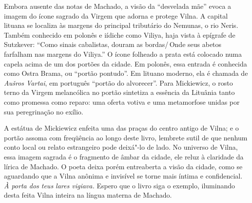 Embora ausente das notas de Machado, a visão da ``desvelada mãe'' evoca
a imagem do ícone sagrado da Virgem que adorna e protege Vilna. A
capital lituana se localiza às margens do principal tributário do
Nemunas, o rio Neris. Também conhecido em polonês e iídiche como Viliya, haja 
vista à epígrafe de Sutzkever: ``Como sinais cabalistas, douram
as bordas/\,Onde seus abetos farfalham nas margens do Viliya.'' O ícone
folheado a prata está colocado numa capela acima de um dos portões da
cidade. Em polonês, essa entrada é conhecida como Ostra Brama, ou
``portão pontudo''. Em lituano moderno, ela é chamada de \textit{Aušros
Vartai}, em português ``portão do alvorecer''. Para Mickiewicz, o rosto terno da Virgem
melancólica no portão sintetiza a essência da Lituânia tanto como
promessa como reparo: uma oferta votiva e uma metamorfose unidas por sua
peregrinação no exílio. 

A estátua de Mickiewicz enfeita uma das praças
do centro antigo de Vilna; e o portão assoma com freqüência ao longo
deste livro, lembrete sutil de que nenhum conto local ou relato
estrangeiro pode deixá"-lo de lado. No universo de Vilna, essa imagem
sagrada é o fragmento de âmbar da cidade, ele reluz à claridade da
lírica de Machado. O poeta deixa porém entreaberta a visão da cidade,
como se aguardando que a Vilna anônima e invisível se torne mais íntima
e confidencial. \textit{À porta dos teus lares vigiava.} Espero que o
livro siga o exemplo, iluminando desta feita Vilna inteira na língua
materna de Machado.